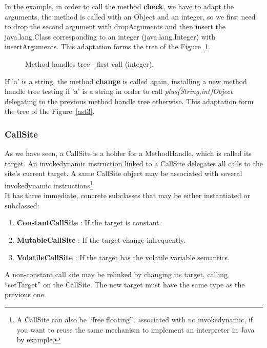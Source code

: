 \documentclass{sig-alternate}
\begin{document}
      In the example, in order to call the method {\bf check}, we have to adapt the arguments,
      the method is called with an Object and an integer, so we first need to drop the second
      argument with dropArguments and then insert the java.lang.Class corresponding to an integer
      (java.lang.Integer) with insertArguments.
      This adaptation forms the tree of the Figure~\ref{ast2}.

      \begin{figure}[!ht]
        \hspace{-.6in} \resizebox{1.3\linewidth}{!}{}
        \caption{Method handles tree - first call (integer).}\vspace{-1em}
        \label{ast2}
      \end{figure}

      If 'a' is a string, the method {\bf change} is called again,
      installing a new method handle tree testing if 'a' is a string in order to call {\it plus(String,int)Object}
      delegating to the previous method handle tree otherwise.
      This adaptation form the tree of the Figure~\ref{ast3}.

      \begin{figure*}[!ht]
        \centering \resizebox{.8\linewidth}{!}{}
        \caption{Method handles tree - second call (string).}\vspace{-1em}
        \label{ast3}
      \end{figure*}

    \subsubsection{CallSite}

      As we have seen, a CallSite is a holder for a MethodHandle, which is called its target.
      An invokedynamic instruction linked to a CallSite delegates all calls to the site's current target.
      A same CallSite object may be associated with several invokedynamic
      instructions\footnote{A CallSite can also be ``free floating'', associated with no invokedynamic,
      if you want to reuse the same mechanism to implement an interpreter in Java by example.}\\

      It has three immediate, concrete subclasses that may be either instantiated or subclassed:
      \begin{enumerate}
        \item \textbf{ConstantCallSite} : If the target is constant.
        \item \textbf{MutableCallSite}  : If the target change infrequently.
        \item \textbf{VolatileCallSite} : If the target has the volatile variable semantics.
      \end{enumerate}
      A non-constant call site may be relinked by changing its target, calling ``setTarget'' on the CallSite.
      The new target must have the same type as the previous one.
\end{document}
